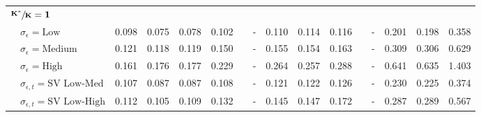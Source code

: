 \begin{table}[!tbp]
\begin{center}
\begin{tabular}{lllllcllllcllll}
\hline
{\bfseries $\mathbf{\sfrac{K^*}{K}=1}$}&&&&&&&&&&&&&&\tabularnewline
~~$\sigma_{\epsilon} =\text{Low}$& 0.098& 0.075& 0.078& 0.102&&-& 0.110& 0.114& 0.116&&-& 0.201& 0.198& 0.358\tabularnewline
~~$\sigma_{\epsilon} =\text{Medium}$& 0.121& 0.118& 0.119& 0.150&&-& 0.155& 0.154& 0.163&&-& 0.309& 0.306& 0.629\tabularnewline
~~$\sigma_{\epsilon} =\text{High}$& 0.161& 0.176& 0.177& 0.229&&-& 0.264& 0.257& 0.288&&-& 0.641& 0.635& 1.403\tabularnewline
~~$\sigma_{\epsilon,t} = \text{SV Low-Med}$& 0.107& 0.087& 0.087& 0.108&&-& 0.121& 0.122& 0.126&&-& 0.230& 0.225& 0.374\tabularnewline
~~$\sigma_{\epsilon,t}  = \text{SV Low-High}$& 0.112& 0.105& 0.109& 0.132&&-& 0.145& 0.147& 0.172&&-& 0.287& 0.289& 0.567\tabularnewline
\hline
\end{tabular}\end{center}
\end{table}
